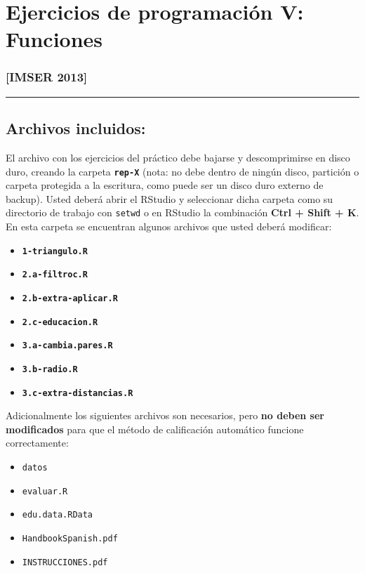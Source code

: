 \documentclass[]{article}
\begin{document}
\section{Ejercicios de programación V: Funciones}

\subsubsection{{[}IMSER 2013{]}}

\begin{center}\rule{3in}{0.4pt}\end{center}

\subsection{Archivos incluidos:}

El archivo con los ejercicios del práctico debe bajarse y descomprimirse
en disco duro, creando la carpeta \textbf{\texttt{rep-X}} (nota: no debe
dentro de ningún disco, partición o carpeta protegida a la escritura,
como puede ser un disco duro externo de backup). Usted deberá abrir el
RStudio y seleccionar dicha carpeta como su directorio de trabajo con
\texttt{setwd} o en RStudio la combinación \textbf{Ctrl + Shift + K}. En
esta carpeta se encuentran algunos archivos que usted deberá modificar:

\begin{itemize}
\item
  \textbf{\texttt{1-triangulo.R}}
\item
  \textbf{\texttt{2.a-filtroc.R}}
\item
  \textbf{\texttt{2.b-extra-aplicar.R}}
\item
  \textbf{\texttt{2.c-educacion.R}}
\item
  \textbf{\texttt{3.a-cambia.pares.R}}
\item
  \textbf{\texttt{3.b-radio.R}}
\item
  \textbf{\texttt{3.c-extra-distancias.R}}
\end{itemize}
Adicionalmente los siguientes archivos son necesarios, pero \textbf{no
deben ser modificados} para que el método de calificación automático
funcione correctamente:

\begin{itemize}
\item
  \texttt{datos}
\item
  \texttt{evaluar.R}
\item
  \texttt{edu.data.RData}
\item
  \texttt{HandbookSpanish.pdf}
\item
  \texttt{INSTRUCCIONES.pdf}
\end{itemize}
\end{document}
